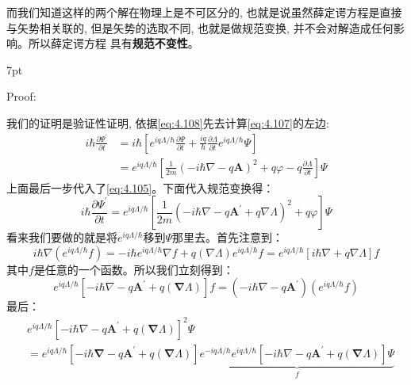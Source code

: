 \documentclass[a4paper,zihao=-4,linespread=1]{ctexrep}
\newenvironment{thinknote}{%
\def\FrameCommand{%
\hspace{1pt}%
{\color{BurlyWood}\vrule width 2pt}%
{\color{formalshade}\vrule width 4pt}%
\colorbox{formalshade}%
}%
\MakeFramed{\advance\hsize-\width\FrameRestore}%
\noindent\hspace{-4.55pt}%
\begin{adjustwidth}{}{7pt}%
\vspace{2pt}\vspace{2pt}%
}
{%
\vspace{2pt}\end{adjustwidth}\endMakeFramed%
}
\begin{document}
    而我们知道这样的两个解在物理上是不可区分的, 也就是说虽然薛定谔方程是直接与矢势相关联的, 但是矢势的选取不同, 也就是做规范变换, 并不会对解造成任何影响。所以薛定谔方程
    具有\textbf{规范不变性}。
    \begin{thinknote}
        Proof:

        \setlength\parindent{2em}我们的证明是验证性证明, 依据\ref{eq:4.108}先去计算\ref{eq:4.107}的左边:
        \begin{align*}
            i\hbar\frac{\partial\Psi^\prime}{\partial t}&=i\hbar\left[e^{iq\Lambda/\hbar}\frac{\partial\Psi}{\partial t}+\frac{i q}{\hbar}\frac{\partial\Lambda}{\partial t}e^{iq\Lambda/\hbar}\Psi\right]\\
            &=e^{iq\Lambda/\hbar}\left[\frac{1}{2m}\left(-i\hbar\nabla-q\mathbf{A}\right)^2+q\varphi-q\frac{\partial\Lambda}{\partial t}\right]\Psi
        \end{align*}
        上面最后一步代入了\ref{eq:4.105}。下面代入规范变换得：
        \begin{equation}
            i\hbar\frac{\partial\Psi^\prime}{\partial t}=e^{iq\Lambda/\hbar}\left[\frac{1}{2m}\left(-i\hbar\nabla-q\mathbf{A}^\prime+q\nabla\Lambda\right)^2+q\varphi\right]\Psi
        \end{equation}
        看来我们要做的就是将$e^{iq\Lambda/\hbar}$移到$\Psi$那里去。首先注意到：
        \begin{equation}
            i\hbar\nabla\left(e^{iq\Lambda/\hbar} f\right)=-i\hbar e^{iq\Lambda/\hbar}\nabla f+q\left(\nabla\Lambda\right)e^{iq\Lambda/\hbar}f=e^{iq\Lambda/\hbar}\left[i\hbar\nabla+q\nabla\Lambda\right]f
        \end{equation}
        其中$f$是任意的一个函数。所以我们立刻得到：
        \[e^{i q \Lambda / \hbar}\left[-i \hbar \nabla-q \mathbf{A}^{\prime}+q(\boldsymbol{\nabla} \Lambda)\right] f=\left(-i \hbar \nabla-q \mathbf{A}^{\prime}\right)\left(e^{i q \Lambda / \hbar} f\right)\]
        最后：
        \begin{equation}
            \begin{aligned}
            &e^{i q \Lambda / \hbar}\left[-i \hbar \nabla-q \mathbf{A}^{\prime}+q(\boldsymbol{\nabla} \Lambda)\right]^{2} \Psi\\ &=e^{i q \Lambda / \hbar}\left[-i \hbar \boldsymbol{\nabla}-q \mathbf{A}^{\prime}+q(\boldsymbol{\nabla} \Lambda)\right] \underbrace{e^{-i q \Lambda / \hbar} e^{i q \Lambda / \hbar}\left[-i \hbar \nabla-q \mathbf{A}^{\prime}+q(\boldsymbol{\nabla} \Lambda)\right] \Psi}_{f} \\

\end{aligned}
\end{equation}
\end{thinknote}
\end{document}
